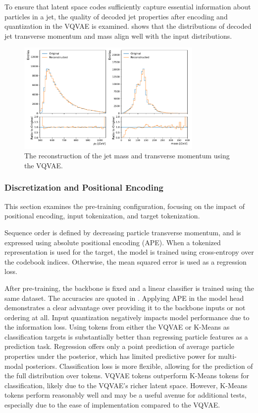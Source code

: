 To ensure that latent space codes sufficiently capture essential information about particles in a jet, the quality of decoded jet properties after encoding and quantization in the VQVAE is examined.
 shows that the distributions of decoded jet transverse momentum and mass align well with the input distributions.

\begin{figure}[htp!]
    \centering
    \includegraphics[width=0.8\textwidth]{Figures/foundation_models/mpm1/jet_high_img.pdf}
    \caption{
        \label{fig:vq_vae}
        The reconstruction of the jet mass and transverse momentum using the VQVAE.
    }
\end{figure}

\subsubsection{Discretization and Positional Encoding}

This section examines the pre-training configuration, focusing on the impact of positional encoding, input tokenization, and target tokenization.

Sequence order is defined by decreasing particle transverse momentum, and is expressed using absolute positional encoding (APE).
When a tokenized representation is used for the target, the model is trained using cross-entropy over the codebook indices.
Otherwise, the mean squared error is used as a regression loss.

After pre-training, the backbone is fixed and a linear classifier is trained using the same dataset.
The accuracies are quoted in .
Applying APE in the model head demonstrates a clear advantage over providing it to the backbone inputs or not ordering at all.
Input quantization negatively impacts model performance due to the information loss.
Using tokens from either the VQVAE or K-Means as classification targets is substantially better than regressing particle features as a prediction task.
Regression offers only a point prediction of average particle properties under the posterior, which has limited predictive power for multi-modal posteriors.
Classification loss is more flexible, allowing for the prediction of the full distribution over tokens.
VQVAE tokens outperform K-Means tokens for classification, likely due to the VQVAE's richer latent space.
However, K-Means tokens perform reasonably well and may be a useful avenue for additional tests, especially due to the ease of implementation compared to the VQVAE.

